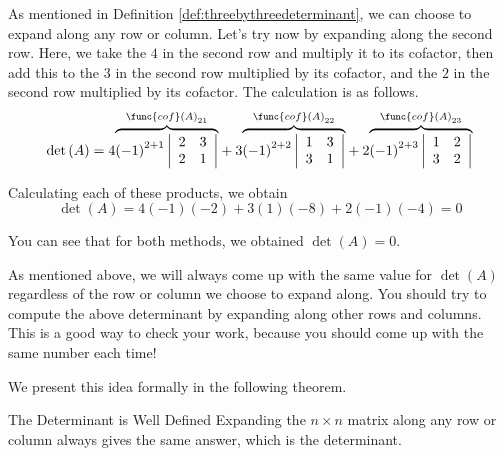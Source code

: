 \begin{solution}
As mentioned in Definition \ref{def:threebythreedeterminant}, we can choose to 
expand along any row or column. Let's try now by expanding along the second row.
Here, we take the $4$ in the second row and multiply it to its cofactor, then 
add this to the $3$ in the second row multiplied by its cofactor, and the $2$ in the 
second row multiplied by its cofactor. The calculation is as follows. 
\begin{equation*}
\det \left(A\right)
=
4 \overset{\func{cof}\left( A\right) _{21}}{\overbrace{\left( -1\right)
^{2+1}\left|
\begin{array}{rr}
2 & 3 \\
2 & 1
\end{array}
\right| }}+3 \overset{\func{cof}\left( A\right) _{22}}{\overbrace{\left(
-1\right) ^{2+2}\left|
\begin{array}{rr}
1 & 3 \\
3 & 1
\end{array}
\right| }}+2 \overset{\func{cof}\left( A\right) _{23}}{\overbrace{\left(
-1\right) ^{2+3}\left|
\begin{array}{rr}
1 & 2 \\
3 & 2
\end{array}
\right| }}
\end{equation*}

Calculating each of these products, we obtain
\begin{equation*}
\det \left(A\right)
=
4\left(-1\right)\left(-2\right) 
+
3\left(1\right)\left(-8\right) 
+
2 \left(-1\right)\left(-4\right)
=
0
\end{equation*}

You can see that for both methods, we obtained $\det \left(A\right) = 0$. 
\end{solution}

As mentioned above, we will always come up with the same value for $\det \left(A\right)$ regardless of the row or column 
we choose to expand along. You should try to compute the above determinant by expanding along other
rows and columns. This is a good way to check your work, because you should come up 
with the same number each time!  

We present this idea formally in the following theorem.

\begin{theorem}{The Determinant is Well Defined}\label{thm:welldefineddeterminant}
Expanding the $n\times n$ matrix along any row or column always gives the
same answer, which is the determinant.
\end{theorem}


